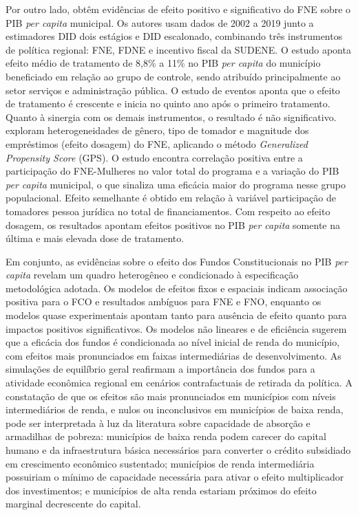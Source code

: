 Por outro lado,  obtêm evidências de efeito positivo e significativo do FNE sobre o PIB \textit{per capita} municipal. Os autores usam dados de 2002 a 2019 junto a estimadores DID dois estágios e DID escalonado, combinando três instrumentos de política regional: FNE, FDNE e incentivo fiscal da SUDENE. O estudo aponta efeito médio de tratamento de 8,8\% a 11\% no PIB \textit{per capita} do município beneficiado em relação ao grupo de controle, sendo atribuído principalmente ao setor serviços e administração pública. O estudo de eventos aponta que o efeito de tratamento é crescente e inicia no quinto ano após o primeiro tratamento. Quanto à sinergia com os demais instrumentos, o resultado é não significativo.  exploram heterogeneidades de gênero, tipo de tomador e magnitude dos empréstimos (efeito dosagem) do FNE, aplicando o método \textit{Generalized Propensity Score} (GPS). O estudo encontra correlação positiva entre a participação do FNE-Mulheres no valor total do programa e a variação do PIB \textit{per capita} municipal, o que sinaliza uma eficácia maior do programa nesse grupo populacional. Efeito semelhante é obtido em relação à variável participação de tomadores pessoa jurídica no total de financiamentos. Com respeito ao efeito dosagem, os resultados apontam efeitos positivos no PIB \textit{per capita} somente na última e mais elevada dose de tratamento.

Em conjunto, as evidências sobre o efeito dos Fundos Constitucionais no PIB \textit{per capita} revelam um quadro heterogêneo e condicionado à especificação metodológica adotada. Os modelos de efeitos fixos e espaciais indicam associação positiva para o FCO e resultados ambíguos para FNE e FNO, enquanto os modelos quase experimentais apontam tanto para ausência de efeito quanto para impactos positivos significativos. Os modelos não lineares e de eficiência sugerem que a eficácia dos fundos é condicionada ao nível inicial de renda do município, com efeitos mais pronunciados em faixas intermediárias de desenvolvimento. As simulações de equilíbrio geral reafirmam a importância dos fundos para a atividade econômica regional em cenários contrafactuais de retirada da política. A constatação de que os efeitos são mais pronunciados em municípios com níveis intermediários de renda, e nulos ou inconclusivos em municípios de baixa renda, pode ser interpretada à luz da literatura sobre capacidade de absorção e armadilhas de pobreza: municípios de baixa renda podem carecer do capital humano e da infraestrutura básica necessários para converter o crédito subsidiado em crescimento econômico sustentado; municípios de renda intermediária possuiriam o mínimo de capacidade necessária para ativar o efeito multiplicador dos investimentos; e municípios de alta renda estariam próximos do efeito marginal decrescente do capital.


